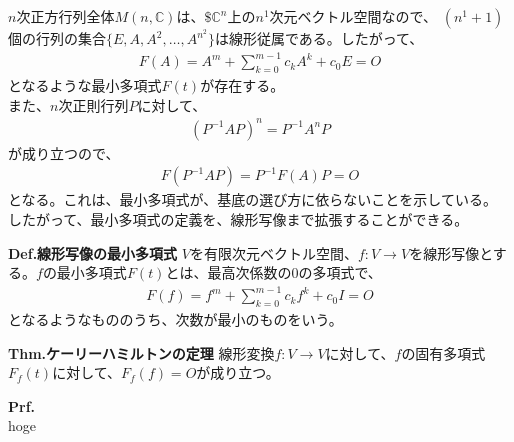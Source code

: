 \documentclass[a4paper,11pt]{jsarticle}
\numberwithin{equation}{section}
\begin{document}
$n$次正方行列全体$M(n, \mathbb{C})$は、$\$\mathbb{C}^n$上の$n^1$次元ベクトル空間なので、
 $(n^1+1)$個の行列の集合$\{E, A, A^2, \dots, A^{n^2}\}$は線形従属である。したがって、
  \begin{align}
      F(A) = A^{m} + \sum_{k=0}^{m-1} c_kA^k + c_0E = O
  \end{align}
  となるような最小多項式$F(t)$が存在する。\\
  また、$n$次正則行列$P$に対して、
  \begin{align}
      (P^{-1}AP)^{n} = P^{-1}A^{n}P
  \end{align}
  が成り立つので、
  \begin{align}
      F(P^{-1}AP) = P^{-1}F(A)P = O
  \end{align}
  となる。これは、最小多項式が、基底の選び方に依らないことを示している。\\
  したがって、最小多項式の定義を、線形写像まで拡張することができる。

  \begin{itembox}[l]{\textbf{Def.線形写像の最小多項式}}
    $V$を有限次元ベクトル空間、$f: V \to V$を線形写像とする。$f$の最小多項式$F(t)$とは、最高次係数の0の多項式で、
    \begin{align}
        F(f) = f^{m} + \sum_{k=0}^{m-1} c_kf^{k} + c_0I = O
    \end{align}
    となるようなもののうち、次数が最小のものをいう。
\end{itembox}

\begin{itembox}[l]{\textbf{Thm.ケーリーハミルトンの定理}}
    線形変換$f: V \to V$に対して、$f$の固有多項式$F_f(t)$に対して、$F_f(f) = O$が成り立つ。
\end{itembox}
\textbf{Prf.}\\
hoge\hfill\qedsymbol\\
\end{document}
